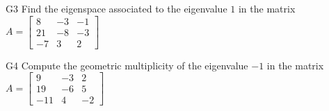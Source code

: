 \documentclass{sbgLAexam}
\begin{document}
\begin{problem}{G3}
Find the eigenspace associated to the eigenvalue $1$ in the matrix $A=\begin{bmatrix} 8 & -3 & -1 \\ 21 & -8 & -3 \\ -7 & 3  & 2 \end{bmatrix}$
\end{problem}
\newpage

\begin{problem}{G4}
Compute the geometric multiplicity of the eigenvalue $-1$ in the matrix $A=\begin{bmatrix}9 & -3 & 2 \\ 19 & -6 & 5 \\ -11 & 4 & -2 \end{bmatrix}$
\end{problem}
\end{document}
